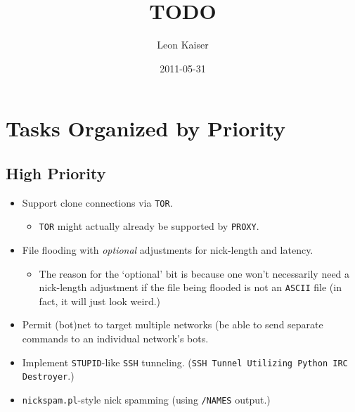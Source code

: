 \documentclass{article}
\title{TODO}
\author{Leon Kaiser}
\date{2011-05-31}
\begin{document}
\maketitle
\tableofcontents
{}
\newpage
\section{Tasks Organized by Priority}\label{Tasks Organized by Priority}
\subsection{High Priority}\label{High Priority}
\begin{itemize}
\item Support clone connections via {\tt TOR}.
\begin{itemize}
\item {\tt TOR} might actually already be supported by {\tt PROXY}.
\end{itemize}
\item File flooding with \emph{optional} adjustments for nick-length and latency.
\begin{itemize}
\item The reason for the `optional' bit is because one won't necessarily need a nick-length adjustment if the file being flooded is not an {\tt ASCII} file (in fact, it will just look weird.)
\end{itemize}
\item Permit (bot)net to target multiple networks (be able to send separate commands to an individual network's bots.
\item Implement {\tt STUPID}-like {\tt SSH} tunneling. ({\tt SSH Tunnel Utilizing Python IRC Destroyer}.)
\item {\tt nickspam.pl}-style nick spamming (using {\tt /NAMES} output.)
\end{itemize}
\end{document}

